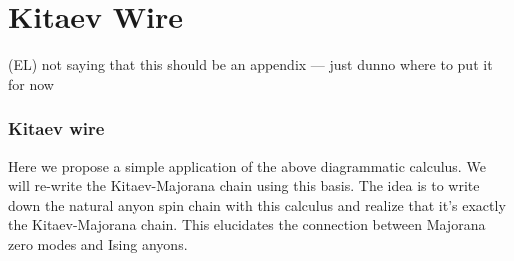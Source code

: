 \documentclass[12pt,a4paper]{article}
\newcommand{\tp}{\otimes}
\newcommand{\unit}{\mathds{1}}
\newcommand\be            {\begin{equation}}
\newcommand\ee            {\end{equation}}
\newcommand{\fld}{\mathcal{F}} %
\newcommand{\ethan}[1]{{\color{amethyst}\footnotesize{(EL) #1}}}
\newcommand{\qqo}{\mathord{\vcenter{\hbox{\texttt{[image: qq1.pdf]}}}}}
\newcommand{\qtqo}{\mathord{\vcenter{\hbox{\texttt{[image: qtq1.pdf]}}}}}
\newcommand{\qqto}{\mathord{\vcenter{\hbox{\texttt{[image: qqt1.pdf]}}}}}
\newcommand{\qtqto}{\mathord{\vcenter{\hbox{\texttt{[image: qtqt1.pdf]}}}}}
\begin{document}

\section{Kitaev Wire}

\ethan{not saying that this should be an appendix --- just dunno where to put it for now}
\subsubsection{Kitaev wire}
Here we propose a simple application of the above diagrammatic calculus. 
We will re-write the Kitaev-Majorana chain using this basis. 
The idea is to write down the natural anyon spin chain with this calculus and realize that it's exactly the Kitaev-Majorana chain. 
This elucidates the connection between Majorana zero modes and Ising anyons. 
\end{document}
